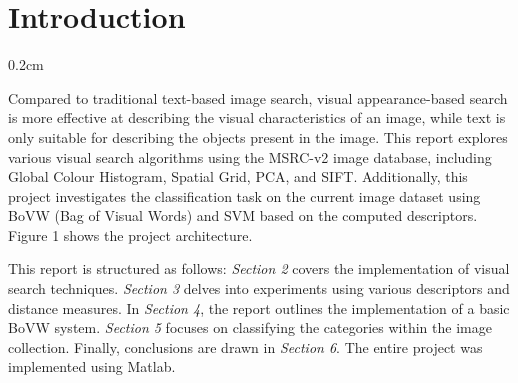 \documentclass{article}
\newcommand{\setParDis}{\setlength {\parskip} {0.2cm} } %
\begin{document}

\section{Introduction}
\setParDis

Compared to traditional text-based image search, visual appearance-based search is more effective at describing the visual characteristics of an image, while text is only suitable for describing the objects present in the image. This report explores various visual search algorithms using the MSRC-v2 image database, including Global Colour Histogram, Spatial Grid, PCA, and SIFT. Additionally, this project investigates the classification task on the current image dataset using BoVW (Bag of Visual Words) and SVM based on the computed descriptors. Figure 1 shows the project architecture.

This report is structured as follows: \textit{Section 2} covers the implementation of visual search techniques. \textit{Section 3} delves into experiments using various descriptors and distance measures. In \textit{Section 4}, the report outlines the implementation of a basic BoVW system. \textit{Section 5} focuses on classifying the categories within the image collection. Finally, conclusions are drawn in \textit{Section 6}. The entire project was implemented using Matlab.




\end{document}
